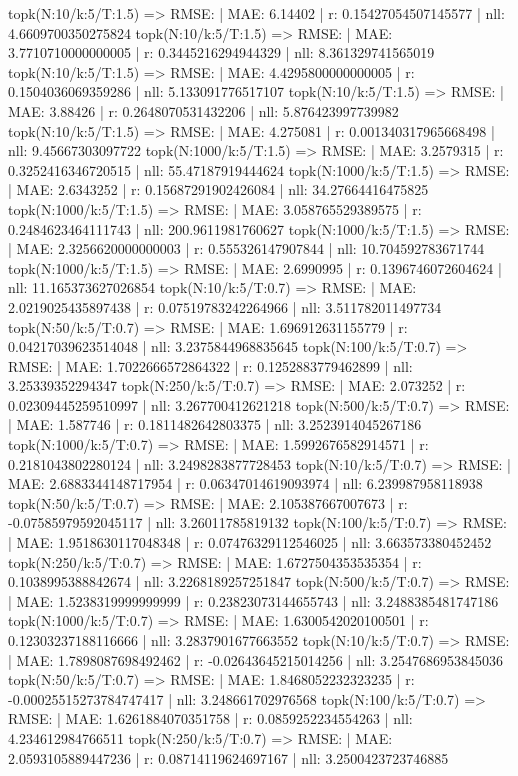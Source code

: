 topk(N:10/k:5/T:1.5) => RMSE: | MAE: 6.14402 | r: 0.15427054507145577 | nll: 4.6609700350275824
topk(N:10/k:5/T:1.5) => RMSE: | MAE: 3.7710710000000005 | r: 0.3445216294944329 | nll: 8.361329741565019
topk(N:10/k:5/T:1.5) => RMSE: | MAE: 4.4295800000000005 | r: 0.1504036069359286 | nll: 5.133091776517107
topk(N:10/k:5/T:1.5) => RMSE: | MAE: 3.88426 | r: 0.2648070531432206 | nll: 5.876423997739982
topk(N:10/k:5/T:1.5) => RMSE: | MAE: 4.275081 | r: 0.001340317965668498 | nll: 9.45667303097722
topk(N:1000/k:5/T:1.5) => RMSE: | MAE: 3.2579315 | r: 0.3252416346720515 | nll: 55.47187919444624
topk(N:1000/k:5/T:1.5) => RMSE: | MAE: 2.6343252 | r: 0.15687291902426084 | nll: 34.27664416475825
topk(N:1000/k:5/T:1.5) => RMSE: | MAE: 3.058765529389575 | r: 0.2484623464111743 | nll: 200.9611981760627
topk(N:1000/k:5/T:1.5) => RMSE: | MAE: 2.3256620000000003 | r: 0.555326147907844 | nll: 10.704592783671744
topk(N:1000/k:5/T:1.5) => RMSE: | MAE: 2.6990995 | r: 0.1396746072604624 | nll: 11.165373627026854
topk(N:10/k:5/T:0.7) => RMSE: | MAE: 2.0219025435897438 | r: 0.07519783242264966 | nll: 3.511782011497734
topk(N:50/k:5/T:0.7) => RMSE: | MAE: 1.696912631155779 | r: 0.04217039623514048 | nll: 3.2375844968835645
topk(N:100/k:5/T:0.7) => RMSE: | MAE: 1.7022666572864322 | r: 0.1252883779462899 | nll: 3.25339352294347
topk(N:250/k:5/T:0.7) => RMSE: | MAE: 2.073252 | r: 0.02309445259510997 | nll: 3.267700412621218
topk(N:500/k:5/T:0.7) => RMSE: | MAE: 1.587746 | r: 0.1811482642803375 | nll: 3.2523914045267186
topk(N:1000/k:5/T:0.7) => RMSE: | MAE: 1.5992676582914571 | r: 0.2181043802280124 | nll: 3.2498283877728453
topk(N:10/k:5/T:0.7) => RMSE: | MAE: 2.6883344148717954 | r: 0.06347014619093974 | nll: 6.239987958118938
topk(N:50/k:5/T:0.7) => RMSE: | MAE: 2.105387667007673 | r: -0.07585979592045117 | nll: 3.26011785819132
topk(N:100/k:5/T:0.7) => RMSE: | MAE: 1.9518630117048348 | r: 0.07476329112546025 | nll: 3.663573380452452
topk(N:250/k:5/T:0.7) => RMSE: | MAE: 1.6727504353535354 | r: 0.1038995388842674 | nll: 3.2268189257251847
topk(N:500/k:5/T:0.7) => RMSE: | MAE: 1.5238319999999999 | r: 0.23823073144655743 | nll: 3.2488385481747186
topk(N:1000/k:5/T:0.7) => RMSE: | MAE: 1.6300542020100501 | r: 0.12303237188116666 | nll: 3.2837901677663552
topk(N:10/k:5/T:0.7) => RMSE: | MAE: 1.7898087698492462 | r: -0.02643645215014256 | nll: 3.2547686953845036
topk(N:50/k:5/T:0.7) => RMSE: | MAE: 1.8468052232323235 | r: -0.00025515273784747417 | nll: 3.248661702976568
topk(N:100/k:5/T:0.7) => RMSE: | MAE: 1.6261884070351758 | r: 0.0859252234554263 | nll: 4.234612984766511
topk(N:250/k:5/T:0.7) => RMSE: | MAE: 2.0593105889447236 | r: 0.08714119624697167 | nll: 3.2500423723746885

